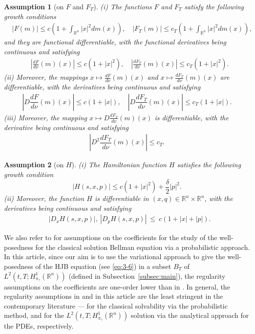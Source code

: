 \documentclass[11pt]{article}
\numberwithin{equation}{section}
\newtheorem{assumption}{Assumption}[section]
\newcommand{\brn}{{\mathbb{R}^n}}
\newcommand{\1}{\mbox{1\hspace{-1mm}I}}
\begin{document}
\begin{assumption}[on $F$ and $F_T$] \label{assumption:F}
    (i) The functions $F$ and $F_T$ satisfy the following growth conditions
    \begin{align*}
        &|F(m)|\le c\left(1+\int_{\brn}|x|^{2}dm(x)\right),\quad \left|F_{T}(m)\right|\le c_{T}\left(1+\int_{\brn}|x|^{2}dm(x)\right),
    \end{align*}
    and they are functional differentiable, with the functional derivatives being continuous and satisfying 
    \begin{align*}
        &\left|\frac{dF}{d\nu}(m)(x)\right|\le c\left(1+|x|^{2}\right),\quad \left|\frac{dF_T}{d\nu}(m)(x)\right|\le c_{T}\left(1+|x|^{2}\right).
    \end{align*}
    (ii) Moreover, the mappings $x\mapsto \frac{dF}{d\nu}(m)(x)$ and $x\mapsto \frac{dF_T}{d\nu}(m)(x)$ are differentiable, with the derivatives being continuous and satisfying
    \begin{align*}
        \left|D\dfrac{dF}{d\nu}(m)(x)\right|\le c(1+|x|),\quad \left|D\dfrac{dF_T}{d\nu}(m)(x)\right|\le c_{T}(1+|x|).
    \end{align*}
    (iii) Moreover, the mapping $x\mapsto D\frac{dF_T}{d\nu}(m)(x)$ is differentiable, with the derivative being continuous and satisfying
    \begin{align*}
        \left|D^{2}\dfrac{dF_T}{d\nu}(m)(x)\right|\leq c_T. 
    \end{align*}
\end{assumption}

\begin{assumption}[on $H$] \label{assumption:H}
    (i) The Hamiltonian function $H$ satisfies the following growth condition
    \begin{equation*}
        |H(s,x,p)|\le c\left(1+|x|^2\right)+\frac{\delta}{2}|p|^{2}. 
    \end{equation*}
    (ii) Moreover, the function $H$ is differentiable in $(x,q)\in\brn\times\brn$, with the derivatives being continuous and satisfying 
    \begin{align*}
        &\left|D_x H(s,x,p)\right|,\ \left|D_p H(s,x,p)\right|\ \le \ c(1+|x|+|p|).
    \end{align*}
\end{assumption}

We also refer to \cite{AB5} for assumptions on the coefficients for the study of the well-posedness for the classical solution Bellman equation via a probabilistic approach. In this article, since our aim is to use the variational approach to give the well-posedness of the HJB equation (see \eqref{eq:3-6}) in a subset $B_T$ of $L^{2}(t,T;H_{\pi_{\gamma}}^{1}(\brn))$ (defined in Subsection~\ref{subsec:main}), the regularity assumptions on the coefficients are one-order lower than in \cite{AB5}. In general, the regularity assumptions in \cite{AB5} and in this article are the least stringent in the contemporary literature --- for the classical solvability via the probabilistic method, and for the $L^{2}(t,T;H_{\pi_{\gamma}}^{1}(\brn))$ solution via the analytical approach for the PDEs, respectively. 
\end{document}
